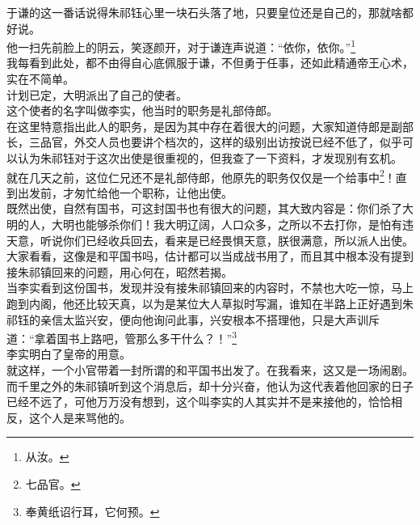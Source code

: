 \begin{multicols}{\theparacolNo}
于谦的这一番话说得朱祁钰心里一块石头落了地，只要皇位还是自己的，那就啥都好说。\\

他一扫先前脸上的阴云，笑逐颜开，对于谦连声说道：“依你，依你。”\footnote{从汝。}\\

我每看到此处，都不由得自心底佩服于谦，不但勇于任事，还如此精通帝王心术，实在不简单。\\

计划已定，大明派出了自己的使者。\\

这个使者的名字叫做李实，他当时的职务是礼部侍郎。\\

在这里特意指出此人的职务，是因为其中存在着很大的问题，大家知道侍郎是副部长，三品官，外交人员也要讲个档次的，这样的级别出访按说已经不低了，似乎可以认为朱祁钰对于这次出使是很重视的，但我查了一下资料，才发现别有玄机。\\

就在几天之前，这位仁兄还不是礼部侍郎，他原先的职务仅仅是一个给事中\footnote{七品官。}！直到出发前，才匆忙给他一个职称，让他出使。\\

既然出使，自然有国书，可这封国书也有很大的问题，其大致内容是：你们杀了大明的人，大明也能够杀你们！我大明辽阔，人口众多，之所以不去打你，是怕有违天意，听说你们已经收兵回去，看来是已经畏惧天意，朕很满意，所以派人出使。\\

大家看看，这像是和平国书吗，估计都可以当成战书用了，而且其中根本没有提到接朱祁镇回来的问题，用心何在，昭然若揭。\\

当李实看到这份国书，发现并没有接朱祁镇回来的内容时，不禁也大吃一惊，马上跑到内阁，他还比较天真，以为是某位大人草拟时写漏，谁知在半路上正好遇到朱祁钰的亲信太监兴安，便向他询问此事，兴安根本不搭理他，只是大声训斥道：“拿着国书上路吧，管那么多干什么？！”\footnote{奉黄纸诏行耳，它何预。}\\

李实明白了皇帝的用意。\\

就这样，一个小官带着一封所谓的和平国书出发了。在我看来，这又是一场闹剧。\\

而千里之外的朱祁镇听到这个消息后，却十分兴奋，他认为这代表着他回家的日子已经不远了，可他万万没有想到，这个叫李实的人其实并不是来接他的，恰恰相反，这个人是来骂他的。\\


\end{multicols}
